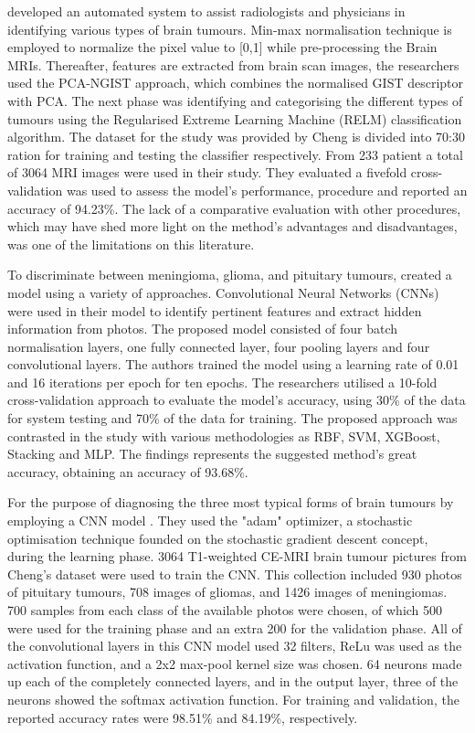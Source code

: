 \documentclass[12pt, a4paper,twoside]{report}
\theoremstyle{plain} %
\theoremstyle{definition} %
\theoremstyle{remark} %
\numberwithin{equation}{chapter}
\begin{document}
\cite{gumaei19} developed an automated system to assist radiologists and physicians in identifying various types of brain tumours. Min-max normalisation technique is employed to normalize the pixel value to [0,1] while pre-processing the Brain MRIs. Thereafter, features are extracted from brain scan images, the researchers used the PCA-NGIST approach, which combines the normalised GIST descriptor with PCA. The next phase was identifying and categorising the different types of tumours using the Regularised Extreme Learning Machine (RELM) classification algorithm. The dataset for the study was provided by Cheng is divided into 70:30 ration for training and testing the classifier respectively. From 233 patient a total of 3064 MRI images were used in their study. They evaluated a fivefold cross-validation was used to assess the model's performance, procedure and reported an accuracy of 94.23\%. The lack of a comparative evaluation with other procedures, which may have shed more light on the method's advantages and disadvantages, was one of the limitations on this literature.

To discriminate between meningioma, glioma, and pituitary tumours, \cite{pashaei18} created a model using a variety of approaches. Convolutional Neural Networks (CNNs) were used in their model to identify pertinent features and extract hidden information from photos. The proposed model consisted of four batch normalisation layers, one fully connected layer,  four pooling layers and four convolutional layers. The authors trained the model using a learning rate of 0.01 and 16 iterations per epoch for ten epochs. The researchers utilised a 10-fold cross-validation approach to evaluate the model's accuracy, using 30\% of the data for system testing and 70\% of the data for training. The proposed approach was contrasted in the study with various methodologies as RBF, SVM, XGBoost, Stacking and MLP. The findings represents the suggested method's great accuracy, obtaining an accuracy of 93.68\%.

For the purpose of diagnosing the three most typical forms of brain tumours by employing a CNN model \cite{abiwinanda19}. They used the "adam" optimizer, a stochastic optimisation technique founded on the stochastic gradient descent concept, during the learning phase. 3064 T1-weighted CE-MRI brain tumour pictures from Cheng's dataset were used to train the CNN. This collection included 930 photos of pituitary tumours, 708 images of gliomas, and 1426 images of meningiomas. 700 samples from each class of the available photos were chosen, of which 500 were used for the training phase and an extra 200 for the validation phase. All of the convolutional layers in this CNN model used 32 filters, ReLu was used as the activation function, and a 2x2 max-pool kernel size was chosen. 64 neurons made up each of the completely connected layers, and in the output layer, three of the neurons showed the softmax activation function. For training and validation, the reported accuracy rates were 98.51\% and 84.19\%, respectively.
\end{document}
